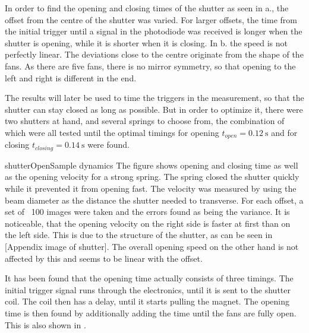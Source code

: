 
In order to find the opening and closing times of the shutter as seen in a., the offset from the centre of the shutter was varied. For larger offsets, the time from the initial trigger until a signal in the photodiode was received is longer when the shutter is opening, while it is shorter when it is closing.
In b. the speed is not perfectly linear. The deviations close to the centre originate from the shape of the fans. As there are five fans, there is no mirror symmetry, so that opening to the left and right is different in the end.

The results will later be used to time the triggers in the measurement, so that the shutter can stay closed as long as possible. But in order to optimize it, there were two shutters at hand, and several springs to choose from, the combination of which were all tested until the optimal timings for opening $t_{open}=\SI{0.12}{\second}$ and for closing $t_{closing}=\SI{0.14}{\second}$ were found.

\pltCustom{
	\begin{center}
		
		
	\end{center}
}
{shutterOpen}{Sample dynamics}{
	The figure shows opening and closing time as well as the opening velocity for a strong spring. The spring closed the shutter quickly while it prevented it from opening fast.
	The velocity was measured by using the beam diameter as the distance the shutter needed to transverse. For each offset, a set of ~100 images were taken and the errors found as being the variance. It is noticeable, that the opening velocity on the right side is faster at first than on the left side. This is due to the structure of the shutter, as can be seen in [Appendix image of shutter].
	The overall opening speed on the other hand is not affected by this and seems to be linear with the offset.
}

It has been found that the opening time actually consists of three timings. The initial trigger signal runs through the electronics, until it is sent to the shutter coil. The coil then has a delay, until it starts pulling the magnet. The opening time is then found by additionally adding the time until the fans are fully open. This is also shown in .

